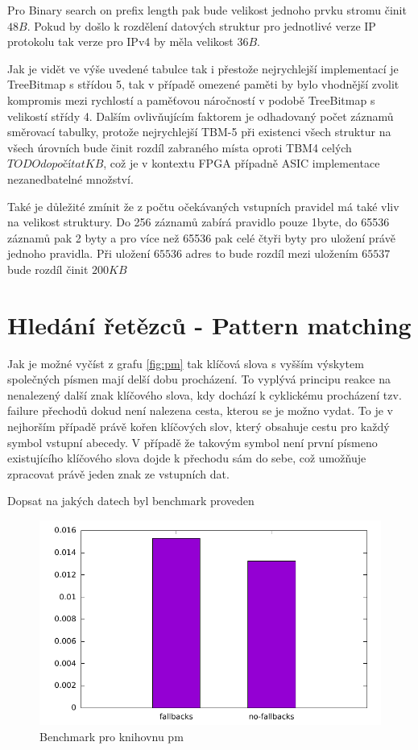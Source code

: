 Pro Binary search on prefix length pak bude velikost jednoho prvku stromu činit $48B$.
Pokud by došlo k rozdělení datových struktur pro jednotlivé verze IP protokolu
tak verze pro IPv4 by měla velikost $36B$.

Jak je vidět ve výše uvedené tabulce tak i přestože nejrychlejší implementací je TreeBitmap s střídou 5,
tak v případě omezené paměti by bylo vhodnější zvolit kompromis mezi rychlostí a paměťovou náročností v podobě
TreeBitmap s velikostí střídy 4. Dalším ovlivňujícím faktorem je odhadovaný počet záznamů směrovací tabulky, protože
nejrychlejší TBM-5 při existenci všech struktur na všech úrovních bude činit rozdíl zabraného místa oproti TBM4
celých $TODO dopočítat KB$, což je v kontextu FPGA případně ASIC implementace nezanedbatelné množství.

Také je důležité zmínit že z počtu očekávaných vstupních pravidel má také vliv na velikost struktury.
Do 256 záznamů zabírá pravidlo pouze 1byte, do 65536 záznamů pak 2 byty a pro více než 65536 pak celé čtyři byty pro uložení právě jednoho pravidla. Při uložení $65536$ adres to bude rozdíl mezi uložením $65537$ bude rozdíl činit
$200KB$


\section{Hledání řetězců - Pattern matching} %
Jak je možné vyčíst z grafu \ref{fig:pm} tak klíčová slova s vyšším výskytem společných písmen
mají delší dobu procházení. To vyplývá principu reakce na nenalezený další znak klíčového slova,
kdy dochází k cyklickému procházení tzv. failure přechodů dokud není nalezena cesta, kterou se je
možno vydat. To je v nejhorším případě právě kořen klíčových slov, který obsahuje cestu
pro každý symbol vstupní abecedy. V případě že takovým symbol není první písmeno
existujícího klíčového slova dojde k přechodu sám do sebe, což umožňuje zpracovat
právě jeden znak ze vstupních dat.

Dopsat na jakých datech byl benchmark proveden
\begin{figure}[!htbp]
	\centering
	\includegraphics[scale=0.7]{fig/pm.pdf}
	\caption{Benchmark pro knihovnu pm}
\end{figure}\label{fig:pm}

